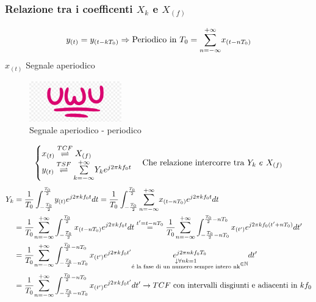                 \subsubsection{Relazione tra i coefficenti $X_k$ e $X_{(f)}$}
                    \[
                        y_{(t)} = y_{(t-kT_0)} \Rightarrow \text{Periodico in }T_0 = \overunderset{+\infty}{n = -\infty}{\sum}x_{(t-nT_0)} 
                    \]
                    $x_{(t)}$ Segnale aperiodico
                    \begin{figure}[H]
                        \centering
                        \includegraphics[width=4cm]{media/uwu.png}
                        \caption{Segnale aperiodico - periodico}
                        \label{fig:Segnale aperiodico periodico}
                    \end{figure}
                    \[
                        \begin{cases}
                            x_{(t)} \overset{TCF}{\rightleftharpoons} X_{(f)} \nonumber \\
                            y_{(t)} \overset{TSF}{\rightleftharpoons}\overunderset{+\infty}{k = -\infty}{\sum}  Y_{k} e^{j2\pi kf_0t}\nonumber
                        \end{cases}  
                        \text{Che relazione intercorre tra }Y_k\ e\ X_{(f)}
                    \]
                    \begin{align}
                        Y_k &= \frac{1}{T_0} \int_{-\frac{T_0}{2}}^{\frac{T_0}{2}} y_{(t)} e^{j2\pi kf_0t} dt =\frac{1}{T_0} \int_{-\frac{T_0}{2}}^{\frac{T_0}{2}} \overunderset{+\infty}{n = -\infty}{\sum}x_{(t-nT_0)} e^{j2\pi kf_0t} dt \nonumber \\
                                &= \frac{1}{T_0} \overunderset{+\infty}{n = -\infty}{\sum} \int_{-\frac{T_0}{2}}^{\frac{T_0}{2}} x_{(t-nT_0)} e^{j2\pi kf_0t} dt \overset{t^\prime = t-nT_0}{=} \frac{1}{T_0} \overunderset{+\infty}{n = -\infty}{\sum} \int_{-\frac{T_0}{2}-nT_0}^{\frac{T_0}{2}-nT_0} x_{(t^\prime)} e^{j2\pi kf_0(t^\prime+nT_0)} dt^\prime  \nonumber \\
                                &= \frac{1}{T_0} \overunderset{+\infty}{n = -\infty}{\sum} \int_{-\frac{T_0}{2}-nT_0}^{\frac{T_0}{2}-nT_0} x_{(t^\prime)} e^{j2\pi kf_0t^\prime} \underset{\substack{\downarrow \forall nk=1 \\\text{é la fase di un numero sempre intero nk}}\in\mathbb{N}}{e^{j2\pi nkf_0T_0}} dt^\prime\nonumber \\
                                &= \frac{1}{T_0} \overunderset{+\infty}{n = -\infty}{\sum} \int_{-\frac{T_0}{2}-nT_0}^{\frac{T_0}{2}-nT_0} x_{(t^\prime)} e^{j2\pi kf_0t^\prime}dt^\prime \rightarrow \text{$TCF$ con intervalli disgiunti e adiacenti in $kf_0$}\nonumber 
                    \end{align}
